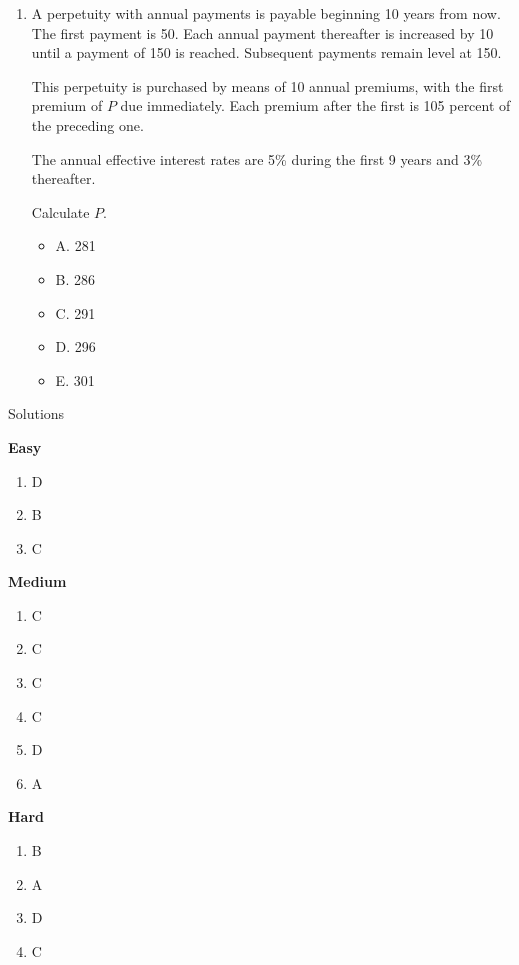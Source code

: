 \documentclass[11pt]{article}
\begin{document}
\begin{enumerate}[label=\textbf{\arabic*.}]
The second annuity is a level $n$-year annuity-immediate, and its Macaulay duration is $X$.

Calculate $X$.

\begin{itemize}
\item A. 3.00
\item B. 3.25
\item C. 3.50
\item D. 4.00
\item E. 4.50
\end{itemize}

\medskip
\hrule
\medskip

\item A perpetuity with annual payments is payable beginning 10 years from now. The first payment is 50. Each annual payment thereafter is increased by 10 until a payment of 150 is reached. Subsequent payments remain level at 150.

This perpetuity is purchased by means of 10 annual premiums, with the first premium of $P$ due immediately. Each premium after the first is 105 percent of the preceding one.

The annual effective interest rates are 5\% during the first 9 years and 3\% thereafter.

Calculate $P$.

\begin{itemize}
\item A. 281
\item B. 286
\item C. 291
\item D. 296
\item E. 301
\end{itemize}

\end{enumerate}


\newpage

Solutions

\textbf{Easy}

\begin{enumerate}
    \item D
    \item B
    \item C
\end{enumerate}

\textbf{Medium}

\begin{enumerate}
    \item C
    \item C
    \item C
    \item C
    \item D
    \item A
\end{enumerate}

\textbf{Hard}

\begin{enumerate}
    \item B
    \item A
    \item D
    \item C
\end{enumerate}
\end{document}
